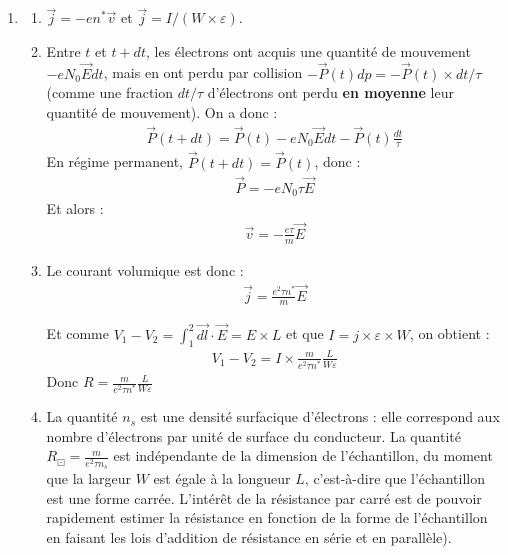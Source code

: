 \newpage

\begin{correction}

\begin{enumerate}

\item

\begin{enumerate}

	\item $\vec{j}=-en^*\vec{v}$ et $\vec{j}=I/(W\times \varepsilon)$.

	\item Entre $t$ et $t+dt$, les électrons ont acquis une quantité de mouvement $-eN_0\vec{E}dt$, mais en ont perdu par collision $-\vec{P}(t)dp=-\vec{P}(t)\times dt/\tau$ (comme une fraction $dt/\tau$ d'électrons ont perdu \textbf{en moyenne} leur quantité de mouvement). On a donc :
	\begin{align*}
		\vec{P}(t+dt) = \vec{P}(t)-eN_0\vec{E}dt-\vec{P}(t)\frac{dt}{\tau}
	\end{align*}
	En régime permanent, $\vec{P}(t+dt) = \vec{P}(t)$, donc :
	\begin{align*}
		\vec{P}=-eN_0\tau\vec{E}
	\end{align*}
	Et alors :
	\begin{align*}
		\vec{v}=-\frac{e\tau}{m}\vec{E}
	\end{align*}
	
	\item Le courant volumique est donc :
	\begin{align*}
		\vec{j}=\frac{e^2\tau n^*}{m}\vec{E}
	\end{align*}
	
	Et comme $V_1-V_2 = \int_1^2\vec{dl}\cdot \vec{E}=E\times L$ et que $I=j\times \varepsilon \times W$, on obtient :
	\begin{align*}
		V_1-V_2 = I\times\frac{m}{e^2\tau n^*}\frac{L}{W\varepsilon}
	\end{align*}
	Donc $R = \frac{m}{e^2\tau n^*}\frac{L}{W\varepsilon}$
	
	\item La quantité $n_s$ est une densité surfacique d'électrons : elle correspond aux nombre d'électrons par unité de surface du conducteur. La quantité $R_\boxdot=\frac{m}{e^2\tau n_s}$ est indépendante de la dimension de l'échantillon, du moment que la largeur $W$ est égale à la longueur $L$, c'est-à-dire que l'échantillon est une forme carrée. L'intérêt de la résistance par carré est de pouvoir rapidement estimer la résistance en fonction de la forme de l'échantillon en faisant les lois d'addition de résistance en série et en parallèle).
	

\end{enumerate}
\end{enumerate}
\end{correction}
